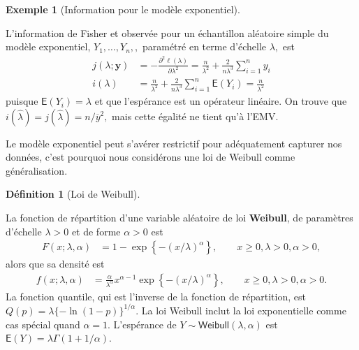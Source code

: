 \documentclass[
  11pt,
  letterpaper,
]{scrbook}
\theoremstyle{plain}
\theoremstyle{plain}
\theoremstyle{definition}
\newtheorem{example}{Exemple}[chapter]
\theoremstyle{definition}
\newtheorem{definition}{Définition}[chapter]
\theoremstyle{remark}
\begin{document}
\begin{example}[Information pour le modèle
exponentiel]\protect\hypertarget{exm-exponentiel-info}{}\label{exm-exponentiel-info}

L'information de Fisher et observée pour un échantillon aléatoire simple
du modèle exponentiel, \(Y_1, \ldots, Y_n,,\) paramétré en terme
d'échelle \(\lambda,\) est \begin{align*}
j(\lambda; \boldsymbol{y}) &= -\frac{\partial^2 \ell(\lambda)}{\partial \lambda^2} = \frac{n}{\lambda^{2}} + \frac{2}{n\lambda^{3}}\sum_{i=1}^n y_i \\
i(\lambda) &= \frac{n}{\lambda^{2}} + \frac{2}{n\lambda^{3}}\sum_{i=1}^n \mathsf{E}(Y_i)  = \frac{n}{\lambda^{2}}
\end{align*} puisque \(\mathsf{E}(Y_i) = \lambda\) et que l'espérance
est un opérateur linéaire. On trouve que
\(i(\widehat{\lambda}) = j(\widehat{\lambda}) = n/\overline{y}^2,\) mais
cette égalité ne tient qu'à l'EMV.

\end{example}

Le modèle exponentiel peut s'avérer restrictif pour adéquatement
capturer nos données, c'est pourquoi nous considérons une loi de Weibull
comme généralisation.

\begin{definition}[Loi de
Weibull]\protect\hypertarget{def-weibull}{}\label{def-weibull}

La fonction de répartition d'une variable aléatoire de loi
\textbf{Weibull}, de paramètres d'échelle \(\lambda>0\) et de forme
\(\alpha>0\) est \begin{align*}
F(x; \lambda, \alpha) &= 1 - \exp\left\{-(x/\lambda)^\alpha\right\}, \qquad x \geq 0, \lambda>0, \alpha>0,
\end{align*} alors que sa densité est \begin{align*}
f(x; \lambda, \alpha) &= \frac{\alpha}{\lambda^\alpha} x^{\alpha-1}\exp\left\{-(x/\lambda)^\alpha\right\}, \qquad x \geq 0, \lambda>0, \alpha>0.
\end{align*} La fonction quantile, qui est l'inverse de la fonction de
répartition, est \(Q(p) = \lambda\{-\ln(1-p)\}^{1/\alpha}.\) La loi
Weibull inclut la loi exponentielle comme cas spécial quand
\(\alpha=1.\) L'espérance de
\(Y \sim \mathsf{Weibull}(\lambda, \alpha)\) est
\(\mathsf{E}(Y) = \lambda \Gamma(1+1/\alpha).\)

\end{definition}
\end{document}
